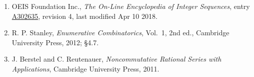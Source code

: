 \documentclass[11pt]{article}
\theoremstyle{definition}
\begin{document}
\begin{enumerate}

\item OEIS Foundation Inc., \emph{The On-Line Encyclopedia of Integer Sequences}, entry \href{https://oeis.org/A302635}{A302635}, revision 4, last modified Apr 10 2018.

\item R. P. Stanley, \emph{Enumerative Combinatorics}, Vol.~1, 2nd ed., Cambridge University Press, 2012; \S4.7.

\item J. Berstel and C. Reutenauer, \emph{Noncommutative Rational Series with Applications}, Cambridge University Press, 2011.

\end{enumerate}
\end{document}
